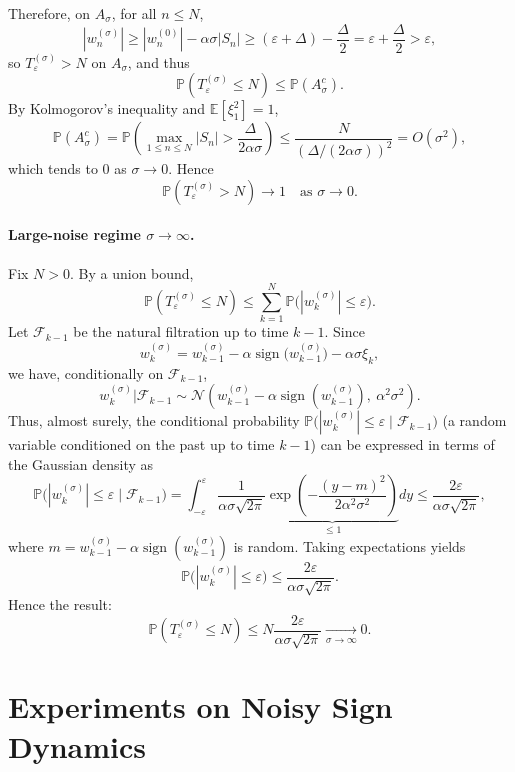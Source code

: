 \documentclass{article}
\theoremstyle{plain}
\theoremstyle{definition}
\theoremstyle{remark}
\newcommand{\E}{\mathbb{E}}
\newcommand{\PP}{\mathbb{P}}
\newcommand{\cF}{\mathcal{F}}
\newcommand{\stepsize}{\alpha}
\newcommand{\sign}{\operatorname{sign}}
\newcommand{\eps}{\varepsilon}
\begin{document}
Therefore, on $A_\sigma$, for all $n\le N$,
\[
  |w_n^{(\sigma)}|
  \ge |w_n^{(0)}| - \stepsize\sigma |S_n|
  \ge (\eps+\Delta) - \frac{\Delta}{2}
  = \eps + \frac{\Delta}{2}
  > \eps,
\]
so $T_\eps^{(\sigma)}>N$ on $A_\sigma$, and thus
\[
  \PP(T_\eps^{(\sigma)} \le N) \le \PP(A_\sigma^c).
\]
By Kolmogorov's inequality and $\E[\xi_1^2]=1$,
\[
  \PP(A_\sigma^c)
  = \PP\left(
      \max_{1\le n\le N} |S_n|
      > \frac{\Delta}{2\stepsize\sigma}
    \right)
  \le \frac{N}{(\Delta/(2\stepsize\sigma))^2}
  = O(\sigma^2),
\]
which tends to $0$ as $\sigma\to 0$. Hence
\[
  \PP(T_\eps^{(\sigma)} > N)\longrightarrow 1
  \quad \text{as } \sigma\to 0.
\]

\paragraph{Large-noise regime \texorpdfstring{$\sigma\to\infty$}{sigma→∞}.}
Fix $N>0$. By a union bound,
\[
  \PP(T_\eps^{(\sigma)} \le N)
  \le \sum_{k=1}^N \PP\bigl(|w_k^{(\sigma)}|\le \eps\bigr).
\]
Let $\cF_{k-1}$ be the natural filtration up to time $k-1$. Since
\[
  w_k^{(\sigma)}
  = w_{k-1}^{(\sigma)}
    - \stepsize\sign\bigl(w_{k-1}^{(\sigma)}\bigr)
    - \stepsize\sigma\xi_k,
\]
we have, conditionally on $\cF_{k-1}$,
\[
  w_k^{(\sigma)} \big| \cF_{k-1}
  \sim \mathcal N\left(
    w_{k-1}^{(\sigma)} - \stepsize\sign(w_{k-1}^{(\sigma)}),
    \ \stepsize^2\sigma^2
  \right).
\]
Thus, almost surely, the conditional probability $\PP\bigl(|w_k^{(\sigma)}|\le \eps \mid \cF_{k-1}\bigr)$ 
(a random variable conditioned on the past up to time $k-1$) can be expressed in terms of the Gaussian density as
\[
  \PP\bigl(|w_k^{(\sigma)}|\le \eps \mid \cF_{k-1}\bigr)
  = \int_{-\eps}^{\eps}
    \frac{1}{\stepsize\sigma\sqrt{2\pi}}
    \underbrace{\exp\left(-\frac{(y-m)^2}{2\stepsize^2\sigma^2}\right)}_{\le 1} dy
  \le \frac{2\eps}{\stepsize\sigma\sqrt{2\pi}},
\]
where $m=w_{k-1}^{(\sigma)}-\stepsize\sign(w_{k-1}^{(\sigma)})$ is random. 
Taking expectations yields
\[
  \PP\bigl(|w_k^{(\sigma)}|\le \eps\bigr)
  \le \frac{2\eps}{\stepsize\sigma\sqrt{2\pi}}.
\]
Hence the result:
\[
  \PP(T_\eps^{(\sigma)} \le N)
  \le N\frac{2\eps}{\stepsize\sigma\sqrt{2\pi}}
  \xrightarrow[\sigma\to\infty]{} 0.
\]

\section{Experiments on Noisy Sign Dynamics}
\end{document}

